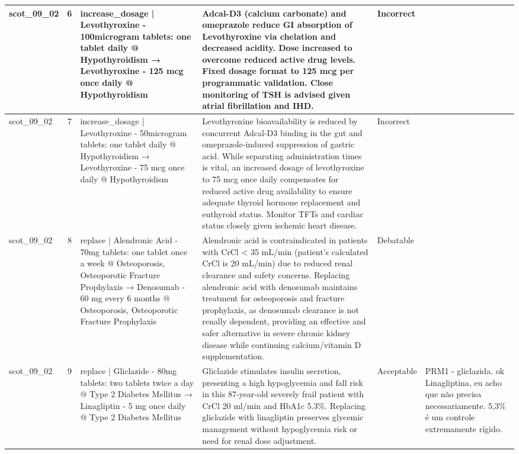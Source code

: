 \begin{longtable}{|p{1.45cm}|c|p{3.3cm}|p{6.5cm}|p{1.55cm}|p{2.3cm}|}
\hline
scot\_09\_02 & 6 & increase\_dosage | Levothyroxine - 100microgram tablets: one tablet daily @ Hypothyroidism → Levothyroxine - 125 mcg once daily @ Hypothyroidism & Adcal-D3 (calcium carbonate) and omeprazole reduce GI absorption of Levothyroxine via chelation and decreased acidity. Dose increased to overcome reduced active drug levels. Fixed dosage format to 125 mcg per programmatic validation. Close monitoring of TSH is advised given atrial fibrillation and IHD. & Incorrect &  \\
\hline
scot\_09\_02 & 7 & increase\_dosage | Levothyroxine - 50microgram tablets: one tablet daily @ Hypothyroidism → Levothyroxine - 75 mcg once daily @ Hypothyroidism & Levothyroxine bioavailability is reduced by concurrent Adcal-D3 binding in the gut and omeprazole-induced suppression of gastric acid. While separating administration times is vital, an increased dosage of levothyroxine to 75 mcg once daily compensates for reduced active drug availability to ensure adequate thyroid hormone replacement and euthyroid status. Monitor TFTs and cardiac status closely given ischemic heart disease. & Incorrect &  \\
\hline
scot\_09\_02 & 8 & replace | Alendronic Acid - 70mg tablets: one tablet once a week @ Osteoporosis, Osteoporotic Fracture Prophylaxis → Denosumab - 60 mg every 6 months @ Osteoporosis, Osteoporotic Fracture Prophylaxis & Alendronic acid is contraindicated in patients with CrCl < 35 mL/min (patient's calculated CrCl is 20 mL/min) due to reduced renal clearance and safety concerns. Replacing alendronic acid with denosumab maintains treatment for osteoporosis and fracture prophylaxis, as denosumab clearance is not renally dependent, providing an effective and safer alternative in severe chronic kidney disease while continuing calcium/vitamin D supplementation. & Debatable &  \\
\hline
scot\_09\_02 & 9 & replace | Gliclazide - 80mg tablets: two tablets twice a day @ Type 2 Diabetes Mellitus → Linagliptin - 5 mg once daily @ Type 2 Diabetes Mellitus & Gliclazide stimulates insulin secretion, presenting a high hypoglycemia and fall risk in this 87-year-old severely frail patient with CrCl 20 ml/min and HbA1c 5.3\%. Replacing gliclazide with linagliptin preserves glycemic management without hypoglycemia risk or need for renal dose adjustment. & Acceptable & PRM1 - gliclazida. ok Linagliptina, eu acho que não precisa necessariamente. 5,3\% é um controle extremamente rígido. \\
\hline

\end{longtable}
